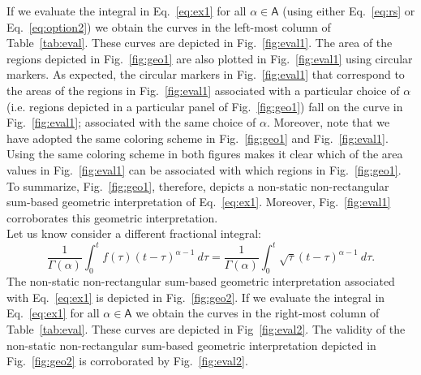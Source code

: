 \documentclass{article}
\theoremstyle{theorem}
\theoremstyle{definition}
\begin{document}
\noindent
If we evaluate the integral in Eq.~\eqref{eq:ex1} for all $\alpha\in \mathsf{A}$ (using either Eq.~\eqref{eq:rs} or Eq.~\eqref{eq:option2}) we obtain the curves in the 
left-most column of Table~\ref{tab:eval}. These curves are depicted in Fig.~\ref{fig:eval1}.
The area of the regions depicted in Fig.~\ref{fig:geo1} are also plotted in Fig.~\ref{fig:eval1} using circular markers. As expected, the circular markers in Fig.~\ref{fig:eval1} that correspond to the areas of the regions in Fig.~\ref{fig:eval1}  
associated with a particular choice of $\alpha$ (i.e. regions depicted in a particular panel of Fig.~\ref{fig:geo1}) fall on the curve in Fig.~\ref{fig:eval1}; associated with the same choice of $\alpha$. Moreover, note that we have adopted the 
same coloring scheme in Fig.~\ref{fig:geo1} and Fig.~\ref{fig:eval1}. Using the same coloring scheme in both figures makes it clear which of the area values in Fig.~\ref{fig:eval1} can be associated with which regions in Fig.~\ref{fig:geo1}.
To summarize, Fig.~\ref{fig:geo1}, therefore, depicts a non-static non-rectangular sum-based geometric interpretation of Eq.~\eqref{eq:ex1}. Moreover, Fig.~\ref{fig:eval1} corroborates this 
geometric interpretation.\\

\noindent
Let us know consider a different fractional integral:
\begin{equation}
\label{eq:ex2}
\frac{1}{\Gamma(\alpha)}\int_0^t f(\tau) (t-\tau)^{\alpha-1}~d\tau = \frac{1}{\Gamma(\alpha)}\int_0^t \sqrt{\tau}(t-\tau)^{\alpha-1}~d\tau. 
\end{equation}
The non-static non-rectangular sum-based geometric interpretation associated with Eq.~\eqref{eq:ex1} is depicted in Fig.~\ref{fig:geo2}. 
If we evaluate the integral in Eq.~\eqref{eq:ex1} for all $\alpha\in \mathsf{A}$ we obtain the curves in the right-most column of Table~\ref{tab:eval}. 
These curves are depicted in Fig~\ref{fig:eval2}.
The validity of the non-static non-rectangular sum-based geometric interpretation depicted in Fig.~\ref{fig:geo2} is corroborated by Fig.~\ref{fig:eval2}. 
\end{document}
